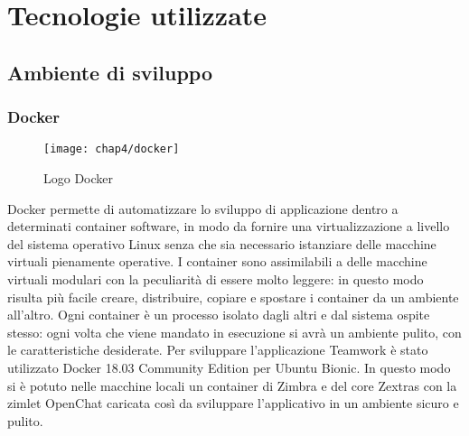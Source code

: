 
\chapter{Tecnologie utilizzate}\label{chap:tec}


\section{Ambiente di sviluppo}
\subsection{Docker}
	\begin{figure}[H] 
		\centering
		\texttt{[image: chap4/docker]}
		\caption{Logo Docker}
	\end{figure}
Docker permette di automatizzare lo sviluppo di applicazione dentro a 
determinati container software, 
in modo da fornire una virtualizzazione a livello del sistema operativo Linux
senza che sia necessario istanziare delle macchine virtuali pienamente 
operative.
I container sono assimilabili a delle macchine virtuali modulari con la
peculiarità di essere molto leggere: in questo modo risulta più facile creare,
distribuire, copiare e spostare i container da un ambiente all'altro.
Ogni container è un processo isolato dagli altri  e dal sistema ospite stesso: ogni
volta che viene mandato in esecuzione si avrà un ambiente pulito, con le
caratteristiche desiderate.  
Per sviluppare l'applicazione Teamwork è stato utilizzato Docker 18.03
Community Edition per Ubuntu Bionic. In questo modo si è potuto
 nelle macchine locali
un container di Zimbra e del core Zextras con la zimlet OpenChat caricata così
da sviluppare l'applicativo in un ambiente sicuro e pulito.

